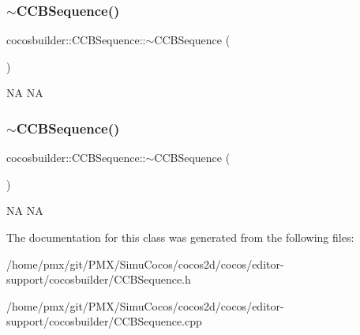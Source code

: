 \subsubsection{\texorpdfstring{$\sim$\+C\+C\+B\+Sequence()}{~CCBSequence()}\hspace{0.1cm}{\footnotesize\ttfamily [1/2]}}
{\footnotesize\ttfamily cocosbuilder\+::\+C\+C\+B\+Sequence\+::$\sim$\+C\+C\+B\+Sequence (\begin{DoxyParamCaption}{ }\end{DoxyParamCaption})}

NA  NA \mbox{\label{classcocosbuilder_1_1CCBSequence_a1700cc0f94b98bf29f717e169b921c9c}} 
\subsubsection{\texorpdfstring{$\sim$\+C\+C\+B\+Sequence()}{~CCBSequence()}\hspace{0.1cm}{\footnotesize\ttfamily [2/2]}}
{\footnotesize\ttfamily cocosbuilder\+::\+C\+C\+B\+Sequence\+::$\sim$\+C\+C\+B\+Sequence (\begin{DoxyParamCaption}{ }\end{DoxyParamCaption})}

NA  NA 

The documentation for this class was generated from the following files\+:\begin{DoxyCompactItemize}
\item 
/home/pmx/git/\+P\+M\+X/\+Simu\+Cocos/cocos2d/cocos/editor-\/support/cocosbuilder/C\+C\+B\+Sequence.\+h\item 
/home/pmx/git/\+P\+M\+X/\+Simu\+Cocos/cocos2d/cocos/editor-\/support/cocosbuilder/C\+C\+B\+Sequence.\+cpp\end{DoxyCompactItemize}
